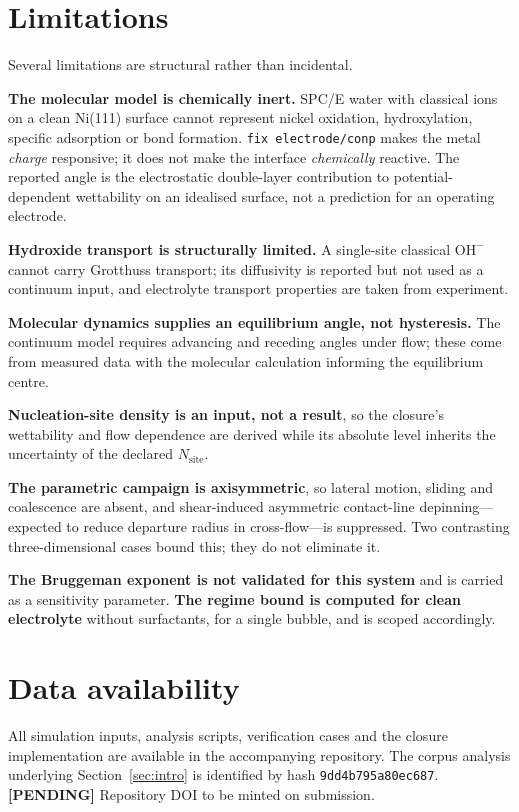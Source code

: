 \documentclass[11pt,a4paper]{article}
\newcommand{\pending}[1]{\textcolor{brick}{\textbf{[PENDING]} #1}}
\begin{document}
\section{Limitations}
Several limitations are structural rather than incidental.

\textbf{The molecular model is chemically inert.} SPC/E water with classical ions on a clean Ni(111)
surface cannot represent nickel oxidation, hydroxylation, specific adsorption or bond formation.
\texttt{fix electrode/conp} makes the metal \emph{charge} responsive; it does not make the interface
\emph{chemically} reactive. The reported angle is the electrostatic double-layer contribution to
potential-dependent wettability on an idealised surface, not a prediction for an operating electrode.

\textbf{Hydroxide transport is structurally limited.} A single-site classical $\mathrm{OH^-}$ cannot
carry Grotthuss transport; its diffusivity is reported but not used as a continuum input, and
electrolyte transport properties are taken from experiment.

\textbf{Molecular dynamics supplies an equilibrium angle, not hysteresis.} The continuum model
requires advancing and receding angles under flow; these come from measured data with the molecular
calculation informing the equilibrium centre.

\textbf{Nucleation-site density is an input, not a result}, so the closure's wettability and flow
dependence are derived while its absolute level inherits the uncertainty of the declared
$N_{\mathrm{site}}$.

\textbf{The parametric campaign is axisymmetric}, so lateral motion, sliding and coalescence are
absent, and shear-induced asymmetric contact-line depinning---expected to reduce departure radius in
cross-flow---is suppressed. Two contrasting three-dimensional cases bound this; they do not eliminate
it.

\textbf{The Bruggeman exponent is not validated for this system} and is carried as a sensitivity
parameter. \textbf{The regime bound is computed for clean electrolyte} without surfactants, for a
single bubble, and is scoped accordingly.

\section*{Data availability}
All simulation inputs, analysis scripts, verification cases and the closure implementation are
available in the accompanying repository. The corpus analysis underlying Section~\ref{sec:intro} is
identified by hash \texttt{9dd4b795a80ec687}. \pending{Repository DOI to be minted on submission.}
\end{document}
